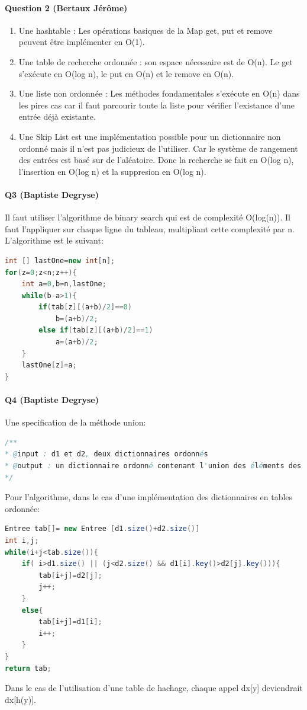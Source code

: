 \documentclass[a4paper]{article}
\begin{document}
\paragraph{Question 2 (Bertaux Jérôme)}
\begin{enumerate}
\item Une hashtable : Les opérations basiques de la Map get, put et remove peuvent être implémenter en O(1).
\item Une table de recherche ordonnée : son espace nécessaire est de O(n). Le get s'exécute en O(log n), le put en O(n) et le remove en O(n).
\item Une liste non ordonnée : Les méthodes fondamentales s'exécute en O(n) dans les pires cas car il faut parcourir toute la liste pour vérifier l'existance d'une entrée déjà existante.
\item Une Skip List est une implémentation possible pour un dictionnaire non ordonné mais il n'est pas judicieux de l'utiliser. Car le système de rangement des entrées est basé sur de l'aléatoire. Donc la recherche se fait en O(log n), l'insertion en O(log n) et la suppresion en O(log n).
\end{enumerate}

\paragraph{Q3 (Baptiste Degryse)}
Il faut utiliser l'algorithme de binary search qui est de complexité O(log(n)). Il faut l'appliquer sur chaque ligne du tableau, multipliant cette complexité par n. L'algorithme est le suivant:
\begin{lstlisting}[language=Java]
int [] lastOne=new int[n];
for(z=0;z<n;z++){
	int a=0,b=n,lastOne;
	while(b-a>1){
		if(tab[z][(a+b)/2]==0)
			b=(a+b)/2;
		else if(tab[z][(a+b)/2]==1)
			a=(a+b)/2;
	}
	lastOne[z]=a;
}

\end{lstlisting}

\paragraph{Q4 (Baptiste Degryse)}
Une specification de la méthode union:
\begin{lstlisting}[language=Java]
/**
* @input : d1 et d2, deux dictionnaires ordonnés
* @output : un dictionnaire ordonné contenant l'union des éléments des deux dictionnaires passés en entrée.
*/
\end{lstlisting}
Pour l'algorithme, dans le cas d'une implémentation des dictionnaires en tables ordonnée:
\begin{lstlisting}[language=Java]
Entree tab[]= new Entree [d1.size()+d2.size()]
int i,j;
while(i+j<tab.size()){
	if( i>d1.size() || (j<d2.size() && d1[i].key()>d2[j].key())){
		tab[i+j]=d2[j];
		j++;
	}
	else{
		tab[i+j]=d1[i];
		i++;
	}
}
return tab;
\end{lstlisting}
Dans le cas de l'utilisation d'une table de hachage, chaque appel dx[y] deviendrait dx[h(y)].
\end{document}
